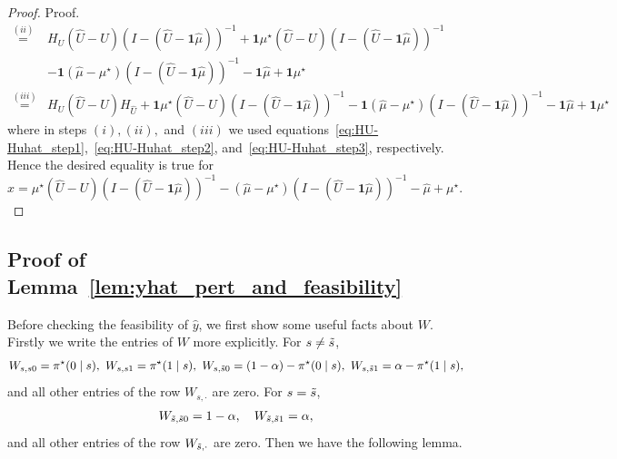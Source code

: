 \documentclass[mnsc,nonblindrev]{informs3}
\newcommand{\one}{\mathbf{1}}
\newcommand{\pistar}{\pi^\star}
\newcommand{\muhat}{\widehat{\mu}}
\newcommand{\uhat}{\widehat{U}}
\newcommand{\yhat}{\widehat{y}}
\begin{document}
\begin{APPENDICES}
\begin{proof}{Proof.}
\begin{align*}
    \stackrel{(ii)}{=}& H_U  \left( \uhat - U \right) (I - (\uhat - \one \muhat))^{-1} + \one \mu^\star \left( \uhat - U \right) (I - (\uhat - \one \muhat))^{-1}  \\
    &- \one (\muhat - \mu^\star) (I - (\uhat - \one \muhat))^{-1}  - \one \muhat + \one \mu^\star \\
    \stackrel{(iii)}{=}& H_U  \left( \uhat - U \right) H_{\uhat} + \one \mu^\star \left( \uhat - U \right) (I - (\uhat - \one \muhat))^{-1}  - \one (\muhat - \mu^\star) (I - (\uhat - \one \muhat))^{-1}  - \one \muhat + \one \mu^\star
\end{align*}
where in steps $(i), (ii),$ and $(iii)$ we used equations~\eqref{eq:HU-Huhat_step1},~\eqref{eq:HU-Huhat_step2}, and~\eqref{eq:HU-Huhat_step3}, respectively. Hence the desired equality is true for
$
    x =  \mu^\star \left( \uhat - U \right) (I - (\uhat - \one \muhat))^{-1}  -  (\muhat - \mu^\star) (I - (\uhat - \one \muhat))^{-1}  -  \muhat +  \mu^\star.
$
\end{proof}

\subsection{Proof of Lemma~\ref{lem:yhat_pert_and_feasibility}}\label{subsec:pr-feasibility-yhat}
Before checking the feasibility of $\yhat$, we first show some useful facts about $W$. Firstly we write the entries of \(W\) more explicitly. For \(s\neq\Tilde{s}\),
\begin{align}
    W_{s, s0} = \pistar(0 \mid s), \ W_{s, s1} = \pistar(1 \mid s), \ W_{s, \Tilde{s}0} = (1-\alpha) - \pistar(0\mid s), \ W_{s, \Tilde{s}1} = \alpha - \pistar(1\mid s), \label{eq:W_entries_1}
\end{align}
and all other entries of the row \(W_{s,\cdot}\) are zero. For
\(s=\Tilde{s}\),
\begin{align}
    W_{\Tilde{s}, \Tilde{s}0} = 1-\alpha, \quad W_{\Tilde{s}, \Tilde{s}1} = \alpha, \label{eq:W_entries_2}
\end{align}
and all other entries of the row \(W_{\Tilde{s},\cdot}\) are zero. Then we have the following lemma.


\end{APPENDICES}
\end{document}
